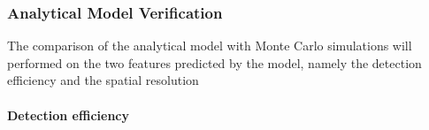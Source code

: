 \documentclass[a4paper,english]{article}
\newcommand{\mr}[2]{\multirow{#1}{*}{#2}}
\begin{document}





\subsubsection{Analytical Model Verification}

The comparison of the analytical model with Monte Carlo simulations will performed on the two features predicted by the model, namely the detection efficiency and the spatial resolution

\paragraph{Detection efficiency}
\end{document}
